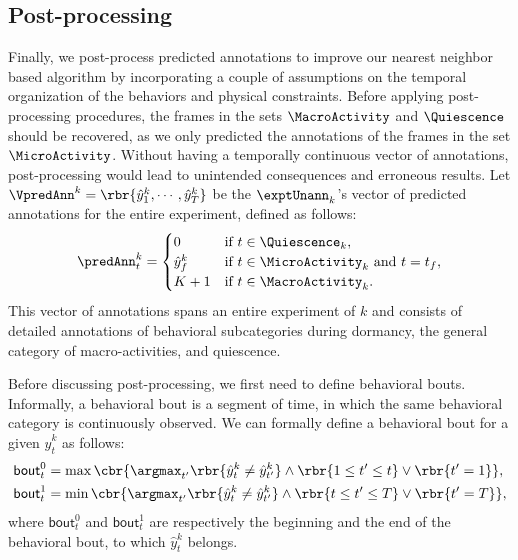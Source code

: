 \subsection{Post-processing}\label{section:postprocessing-predictions}
Finally, we post-process predicted annotations to improve our nearest neighbor based algorithm by incorporating a couple of assumptions on the temporal organization of the behaviors and physical constraints.
Before applying post-processing procedures, the frames in the sets $\MacroActivity$ and $\Quiescence$ should be recovered, as we only predicted the annotations of the frames in the set $\MicroActivity$.
Without having a temporally continuous vector of annotations, post-processing would lead to unintended consequences and erroneous results.
Let $\VpredAnn^k=\rbr{\hat{y}^k_1, \cdots, \hat{y}^k_T}$ be the $\exptUnann_k$'s vector of predicted annotations for the entire experiment, defined as follows:
\begin{equation}
	\predAnn^k_t =
	\begin{cases}
		0           & \textnormal{if } t \in \Quiescence_k,                             \\
		\hat{y}^k_f & \textnormal{if } t \in \MicroActivity_k \textnormal{ and } t=t_f, \\
		K+1         & \textnormal{if } t \in \MacroActivity_k.
	\end{cases}
\end{equation}
This vector of annotations spans an entire experiment of $k$ and consists of detailed annotations of behavioral subcategories during dormancy, the general category of macro-activities, and quiescence.

Before discussing post-processing, we first need to define behavioral bouts.
Informally, a behavioral bout is a segment of time, in which the same behavioral category is continuously observed.
We can formally define a behavioral bout for a given $\hat{y}^k_t$ as follows:
\begin{equation}
	\begin{aligned}
		\mathsf{bout}^0_t & =\max\cbr{{\argmax_{t^\prime} \rbr{\hat{y}^k_t \neq \hat{y}^k_{t^\prime}} \land \rbr{1 \leq t^\prime \leq t} \lor \rbr{t^\prime = 1}}}, \\
		\mathsf{bout}^1_t & =\min\cbr{{\argmax_{t^\prime} \rbr{\hat{y}^k_t \neq \hat{y}^k_{t^\prime}} \land \rbr{t \leq t^\prime \leq T} \lor \rbr{t^\prime = T}}},
	\end{aligned}
\end{equation}
where $\mathsf{bout}^0_t$ and $\mathsf{bout}^1_t$ are respectively the beginning and the end of the behavioral bout, to which $\hat{y}^k_t$ belongs.

